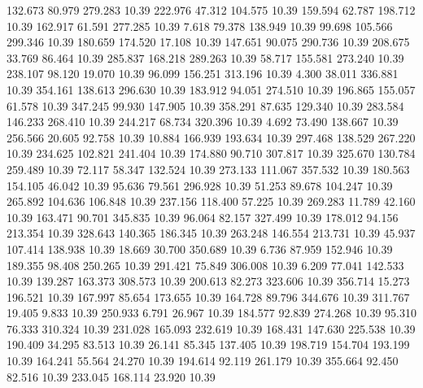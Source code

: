  132.673   80.979  279.283        10.39
 222.976   47.312  104.575        10.39
 159.594   62.787  198.712        10.39
 162.917   61.591  277.285        10.39
   7.618   79.378  138.949        10.39
  99.698  105.566  299.346        10.39
 180.659  174.520   17.108        10.39
 147.651   90.075  290.736        10.39
 208.675   33.769   86.464        10.39
 285.837  168.218  289.263        10.39
  58.717  155.581  273.240        10.39
 238.107   98.120   19.070        10.39
  96.099  156.251  313.196        10.39
   4.300   38.011  336.881        10.39
 354.161  138.613  296.630        10.39
 183.912   94.051  274.510        10.39
 196.865  155.057   61.578        10.39
 347.245   99.930  147.905        10.39
 358.291   87.635  129.340        10.39
 283.584  146.233  268.410        10.39
 244.217   68.734  320.396        10.39
   4.692   73.490  138.667        10.39
 256.566   20.605   92.758        10.39
  10.884  166.939  193.634        10.39
 297.468  138.529  267.220        10.39
 234.625  102.821  241.404        10.39
 174.880   90.710  307.817        10.39
 325.670  130.784  259.489        10.39
  72.117   58.347  132.524        10.39
 273.133  111.067  357.532        10.39
 180.563  154.105   46.042        10.39
  95.636   79.561  296.928        10.39
  51.253   89.678  104.247        10.39
 265.892  104.636  106.848        10.39
 237.156  118.400   57.225        10.39
 269.283   11.789   42.160        10.39
 163.471   90.701  345.835        10.39
  96.064   82.157  327.499        10.39
 178.012   94.156  213.354        10.39
 328.643  140.365  186.345        10.39
 263.248  146.554  213.731        10.39
  45.937  107.414  138.938        10.39
  18.669   30.700  350.689        10.39
   6.736   87.959  152.946        10.39
 189.355   98.408  250.265        10.39
 291.421   75.849  306.008        10.39
   6.209   77.041  142.533        10.39
 139.287  163.373  308.573        10.39
 200.613   82.273  323.606        10.39
 356.714   15.273  196.521        10.39
 167.997   85.654  173.655        10.39
 164.728   89.796  344.676        10.39
 311.767   19.405    9.833        10.39
 250.933    6.791   26.967        10.39
 184.577   92.839  274.268        10.39
  95.310   76.333  310.324        10.39
 231.028  165.093  232.619        10.39
 168.431  147.630  225.538        10.39
 190.409   34.295   83.513        10.39
  26.141   85.345  137.405        10.39
 198.719  154.704  193.199        10.39
 164.241   55.564   24.270        10.39
 194.614   92.119  261.179        10.39
 355.664   92.450   82.516        10.39
 233.045  168.114   23.920        10.39
